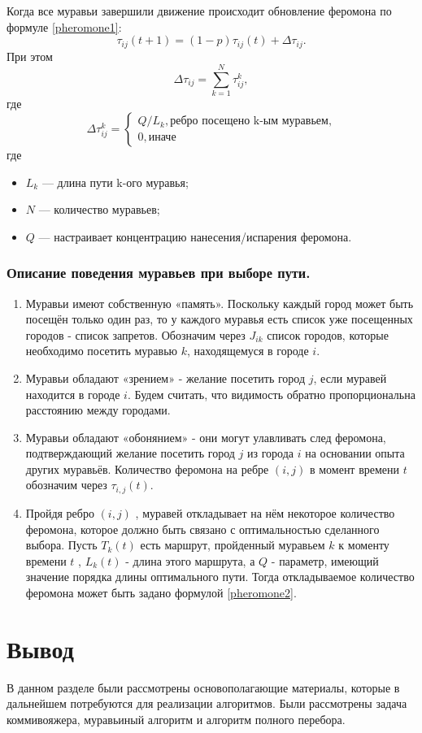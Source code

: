 Когда все муравьи завершили движение происходит обновление феромона по формуле \eqref{pheromone1}:
\begin{equation}
	\label{pheromone1}
		\tau_{ij}(t+1) = (1-p)\tau_{ij}(t) + \Delta \tau_{ij}.
\end{equation}
При этом
\begin{equation}
\label{pheromone11}
 \Delta \tau_{ij} = \sum_{k=1}^N \tau^k_{ij},
\end{equation}
где
\begin{equation}
	\label{pheromone2}
		 \Delta\tau^k_{ij} = \begin{cases}
		Q/L_{k}, \textrm{ребро посещено k-ым муравьем,} \\
		0, \textrm{иначе}
	\end{cases}
\end{equation}
где
\begin{itemize}
	\item $L_{k}$ — длина пути k-ого муравья;
	\item $N$ — количество муравьев;
	\item $Q$ — настраивает концентрацию нанесения/испарения феромона.
\end{itemize}

\subsubsection{Описание поведения муравьев при выборе пути.}

\begin{enumerate}
	\item Муравьи имеют собственную «память».
Поскольку каждый город может быть посещён только один раз, то у каждого муравья есть список уже посещенных городов - список запретов.
Обозначим через $J_{ik}$ список городов, которые необходимо посетить муравью $k$, находящемуся в городе $i$.

\item Муравьи обладают «зрением» - желание посетить город $j$, если муравей находится в городе $i$.
Будем считать, что видимость обратно пропорциональна расстоянию между городами.

\item Муравьи обладают «обонянием» - они могут улавливать след феромона, подтверждающий желание посетить город $j$ из города $i$ на основании опыта других муравьёв.
Количество феромона на ребре $(i,j)$ в момент времени $t$ обозначим через  $\tau_{i,j} (t)$.

\item Пройдя ребро $(i,j)$ , муравей откладывает на нём некоторое количество феромона, которое должно быть связано с оптимальностью сделанного выбора.
Пусть $T _{k} (t)$ есть маршрут, пройденный муравьем $k$ к моменту времени $t$ , $L _{k} (t)$ - длина этого маршрута, а $Q$ - параметр,
имеющий значение порядка длины оптимального пути. Тогда откладываемое количество феромона может быть задано формулой \eqref{pheromone2}.

\end{enumerate}

\section{Вывод}
В данном разделе были рассмотрены основополагающие материалы, которые в дальнейшем потребуются для реализации алгоритмов. Были рассмотрены задача коммивояжера, муравьиный алгоритм и алгоритм полного перебора. 

